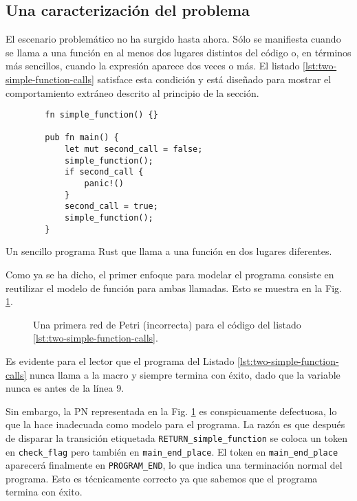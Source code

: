 \subsection{Una caracterización del problema}

El escenario problemático no ha surgido hasta ahora. Sólo se manifiesta cuando se llama a una
función en al menos dos lugares distintos del código o, en términos más sencillos, cuando la
expresión  aparece dos veces o más.
El listado \ref{lst:two-simple-function-calls} satisface esta condición y
está diseñado para mostrar el comportamiento extráneo descrito al principio de la sección.

\begin{listing}[!htb]
    \begin{verbatim}
        fn simple_function() {}

        pub fn main() {
            let mut second_call = false;
            simple_function();
            if second_call {
                panic!()
            }
            second_call = true;
            simple_function();
        }
    \end{verbatim}
    \caption{Un sencillo programa Rust que llama a una función en dos lugares diferentes.}
    \label{lst:two-simple-function-calls}
\end{listing}

Como ya se ha dicho, el primer enfoque para modelar el programa consiste en reutilizar el
modelo de función para ambas llamadas. Esto se muestra en la Fig. \ref{fig:two-function-calls-incorrect-1}.

\begin{figure}[!htbp]
    \centering
    
    \caption{Una primera red de Petri (incorrecta) para el código del listado \ref{lst:two-simple-function-calls}.}
    \label{fig:two-function-calls-incorrect-1}
\end{figure}

Es evidente para el lector que el programa del Listado \ref{lst:two-simple-function-calls}
nunca llama a la macro  y siempre termina con éxito,
dado que la variable  nunca es  antes de la línea 9.

Sin embargo, la \acrshort{PN} representada en la Fig. \ref{fig:two-function-calls-incorrect-1} es conspicuamente defectuosa,
lo que la hace inadecuada como modelo para el programa. La razón es que después de disparar la transición
etiquetada \texttt{RETURN\_simple\_function} se coloca un token en \texttt{check\_flag} pero también en
\texttt{main\_end\_place}. El token en \texttt{main\_end\_place} aparecerá finalmente en \texttt{PROGRAM\_END}, lo
que indica una terminación normal del programa.
Esto es técnicamente correcto ya que sabemos que el programa termina con éxito.

